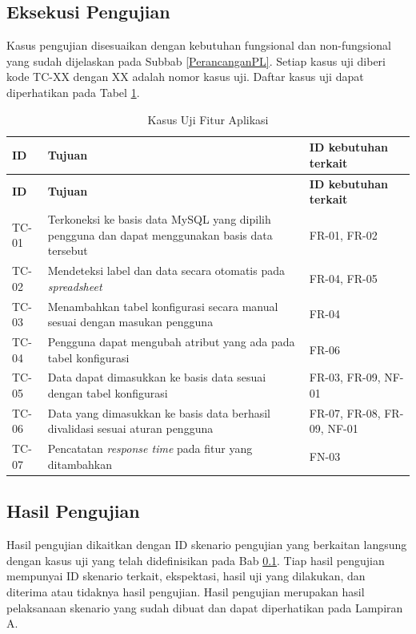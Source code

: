	\subsection{Eksekusi Pengujian} \label{skenarioujian}
	Kasus pengujian disesuaikan dengan kebutuhan fungsional dan non-fungsional yang sudah dijelaskan pada Subbab \ref{PerancanganPL}. Setiap kasus uji diberi kode TC-XX dengan XX adalah nomor kasus uji. Daftar kasus uji dapat diperhatikan pada Tabel \ref{KasusUjiFA}.

	\begin{small}
	\begin{longtable}{ | p{2cm} | p{8cm} | p{3cm} | }
	    \caption{Kasus Uji Fitur Aplikasi}
	    \label{KasusUjiFA}\\ \hline
	    \centering\bfseries{ID} & \centering\bfseries{Tujuan} & \centering\bfseries{ID kebutuhan terkait} \tabularnewline \hline
	    \endfirsthead
	    \hline
	    \centering\bfseries{ID} & \centering\bfseries{Tujuan} & \centering\bfseries{ID kebutuhan terkait} \tabularnewline \hline
	    \endhead
		TC-01 & Terkoneksi ke basis data MySQL yang dipilih pengguna dan dapat menggunakan basis data tersebut& FR-01, FR-02 \\ \hline
		TC-02 & Mendeteksi label dan data secara otomatis pada \textit{spreadsheet} & FR-04, FR-05 \\ \hline
		TC-03 & Menambahkan tabel konfigurasi secara manual sesuai dengan masukan pengguna & FR-04 \\ \hline
		TC-04 & Pengguna dapat mengubah atribut yang ada pada tabel konfigurasi & FR-06 \\ \hline
		TC-05 & Data dapat dimasukkan ke basis data sesuai dengan tabel konfigurasi & FR-03, FR-09, NF-01 \\ \hline
		TC-06 & Data yang dimasukkan ke basis data berhasil divalidasi sesuai aturan pengguna & FR-07, FR-08, FR-09, NF-01 \\ \hline	
		TC-07 & Pencatatan \textit{response time} pada fitur yang ditambahkan & FN-03 \\ \hline
	\end{longtable}
	\end{small}

	\subsection{Hasil Pengujian}
	Hasil pengujian dikaitkan dengan ID skenario pengujian yang berkaitan langsung dengan kasus uji yang telah didefinisikan pada Bab \ref{skenarioujian}. Tiap hasil pengujian mempunyai ID skenario terkait, ekspektasi, hasil uji yang dilakukan, dan diterima atau tidaknya hasil pengujian. Hasil pengujian merupakan hasil pelaksanaan skenario yang sudah dibuat dan dapat diperhatikan pada Lampiran A.